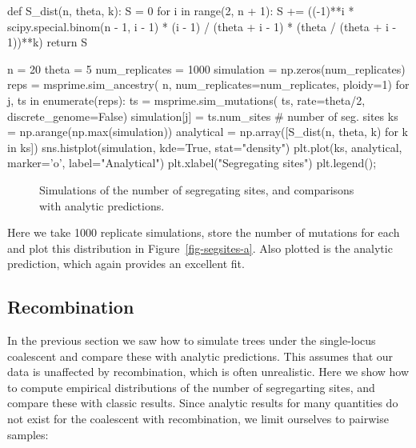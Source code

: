\documentclass[graybox]{svmult}
\begin{document}
\begin{pythoncode}
def S_dist(n, theta, k):
    S = 0
    for i in range(2, n + 1):
        S += ((-1)**i * scipy.special.binom(n - 1, i - 1)
            * (i - 1) / (theta + i - 1)
            * (theta / (theta + i - 1))**k)
    return S

n = 20
theta = 5
num_replicates = 1000
simulation = np.zeros(num_replicates)
reps = msprime.sim_ancestry(
    n, num_replicates=num_replicates, ploidy=1)
for j, ts in enumerate(reps):
    ts = msprime.sim_mutations(
        ts, rate=theta/2, discrete_genome=False)
    simulation[j] = ts.num_sites  # number of seg. sites
ks = np.arange(np.max(simulation))
analytical = np.array([S_dist(n, theta, k) for k in ks])
sns.histplot(simulation, kde=True, stat="density")
plt.plot(ks, analytical, marker='o', label="Analytical")
plt.xlabel("Segregating sites")
plt.legend();
\end{pythoncode}

\begin{figure}[t]
\centering
{}
\qquad\qquad
{}
\caption{\label{fig-segsites}
Simulations of the number of segregating sites, and
comparisons with analytic predictions.
}
\end{figure}

Here we take 1000 replicate simulations, store the number of mutations for each and plot this distribution in
Figure~\ref{fig-segsites-a}. Also plotted is the analytic prediction, which again provides an excellent fit.


\subsection{Recombination}

In the previous section we saw how to simulate trees
under the single-locus coalescent and compare these
with analytic predictions. This assumes that our data is unaffected
by recombination, which is often unrealistic. Here we show how to
compute empirical distributions of the number of segregarting sites, and compare
these with classic results. Since analytic
results for many quantities do not exist for the coalescent with recombination, we limit ourselves to pairwise samples:
\end{document}
